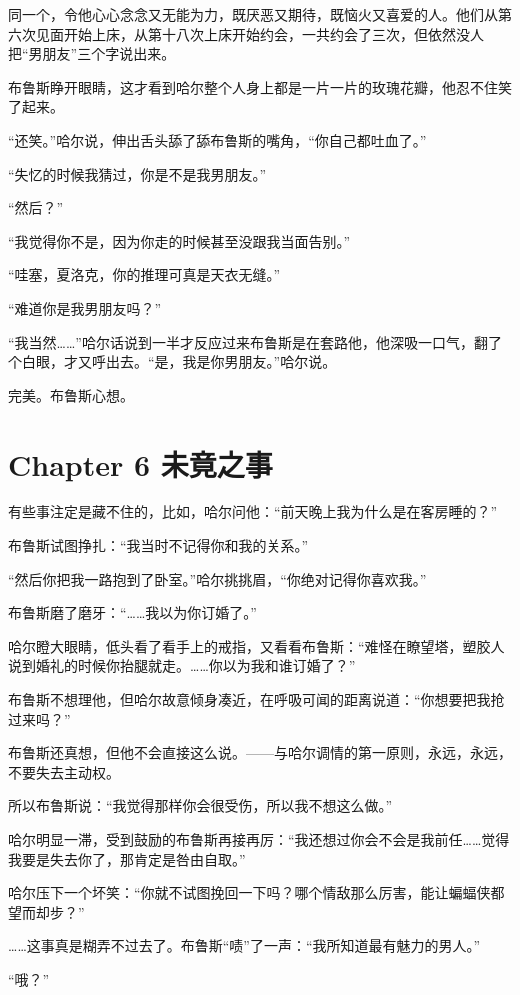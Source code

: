 \documentclass[../main.tex]{subfiles}
\begin{document}
同一个，令他心心念念又无能为力，既厌恶又期待，既恼火又喜爱的人。他们从第六次见面开始上床，从第十八次上床开始约会，一共约会了三次，但依然没人把“男朋友”三个字说出来。

布鲁斯睁开眼睛，这才看到哈尔整个人身上都是一片一片的玫瑰花瓣，他忍不住笑了起来。

“还笑。”哈尔说，伸出舌头舔了舔布鲁斯的嘴角，“你自己都吐血了。”

“失忆的时候我猜过，你是不是我男朋友。”

“然后？”

“我觉得你不是，因为你走的时候甚至没跟我当面告别。”

“哇塞，夏洛克，你的推理可真是天衣无缝。”

“难道你是我男朋友吗？”

“我当然……”哈尔话说到一半才反应过来布鲁斯是在套路他，他深吸一口气，翻了个白眼，才又呼出去。“是，我是你男朋友。”哈尔说。

完美。布鲁斯心想。

\section*{Chapter 6\hspace{1em} 未竟之事}

有些事注定是藏不住的，比如，哈尔问他：“前天晚上我为什么是在客房睡的？”

布鲁斯试图挣扎：“我当时不记得你和我的关系。”

“然后你把我一路抱到了卧室。”哈尔挑挑眉，“你绝对记得你喜欢我。”

布鲁斯磨了磨牙：“……我以为你订婚了。”

哈尔瞪大眼睛，低头看了看手上的戒指，又看看布鲁斯：“难怪在瞭望塔，塑胶人说到婚礼的时候你抬腿就走。……你以为我和谁订婚了？”

布鲁斯不想理他，但哈尔故意倾身凑近，在呼吸可闻的距离说道：“你想要把我抢过来吗？”

布鲁斯还真想，但他不会直接这么说。——与哈尔调情的第一原则，永远，永远，不要失去主动权。

所以布鲁斯说：“我觉得那样你会很受伤，所以我不想这么做。”

哈尔明显一滞，受到鼓励的布鲁斯再接再厉：“我还想过你会不会是我前任……觉得我要是失去你了，那肯定是咎由自取。”

哈尔压下一个坏笑：“你就不试图挽回一下吗？哪个情敌那么厉害，能让蝙蝠侠都望而却步？”

……这事真是糊弄不过去了。布鲁斯“啧”了一声：“我所知道最有魅力的男人。”

“哦？”
\end{document}
